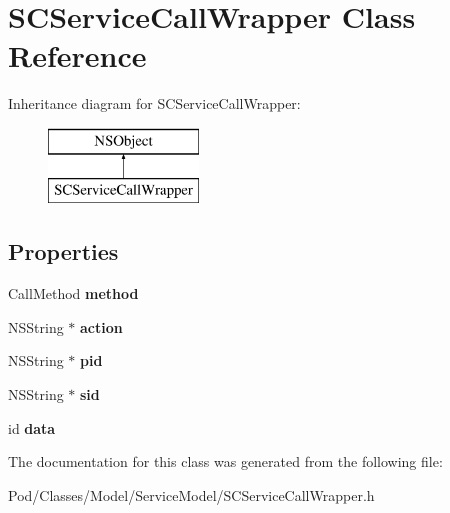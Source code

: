 \hypertarget{interface_s_c_service_call_wrapper}{}\section{S\+C\+Service\+Call\+Wrapper Class Reference}
\label{interface_s_c_service_call_wrapper}
Inheritance diagram for S\+C\+Service\+Call\+Wrapper\+:\begin{figure}[H]
\begin{center}
\leavevmode
\includegraphics[height=2.000000cm]{interface_s_c_service_call_wrapper}
\end{center}
\end{figure}
\subsection*{Properties}
\begin{DoxyCompactItemize}
\item 
Call\+Method {\bfseries method}\hypertarget{interface_s_c_service_call_wrapper_a0f82d4a41b63151dadd928f71a3d0413}{}\label{interface_s_c_service_call_wrapper_a0f82d4a41b63151dadd928f71a3d0413}

\item 
N\+S\+String $\ast$ {\bfseries action}\hypertarget{interface_s_c_service_call_wrapper_ab2d8af9c95c25ce9f854cbe514ef7b3e}{}\label{interface_s_c_service_call_wrapper_ab2d8af9c95c25ce9f854cbe514ef7b3e}

\item 
N\+S\+String $\ast$ {\bfseries pid}\hypertarget{interface_s_c_service_call_wrapper_ad425955d3af5aed5e5c6deb90cbdfc9d}{}\label{interface_s_c_service_call_wrapper_ad425955d3af5aed5e5c6deb90cbdfc9d}

\item 
N\+S\+String $\ast$ {\bfseries sid}\hypertarget{interface_s_c_service_call_wrapper_aa9a1d2b8f80bc35f33cd7cd945cd1c9a}{}\label{interface_s_c_service_call_wrapper_aa9a1d2b8f80bc35f33cd7cd945cd1c9a}

\item 
id {\bfseries data}\hypertarget{interface_s_c_service_call_wrapper_ae03a06456dec51096bb172618378eec7}{}\label{interface_s_c_service_call_wrapper_ae03a06456dec51096bb172618378eec7}

\end{DoxyCompactItemize}


The documentation for this class was generated from the following file\+:\begin{DoxyCompactItemize}
\item 
Pod/\+Classes/\+Model/\+Service\+Model/S\+C\+Service\+Call\+Wrapper.\+h\end{DoxyCompactItemize}
